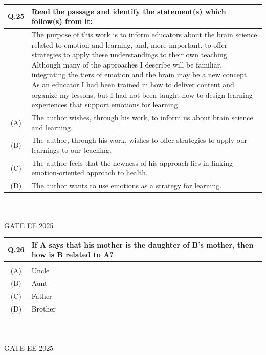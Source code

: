 \documentclass[journal,12pt,onecolumn]{IEEEtran}
\theoremstyle{remark}
\begin{document}
\begin{tabular}{|c|p{16cm}|}\hline
   Q.25 & Read the passage and identify the statement(s) which follow(s) from it: \\   \hline
     & The purpose of this work is to inform educators about the brain science related to emotion and learning, and, more important, to offer strategies to apply these understandings to their own teaching. Although many of the approaches I describe will be familiar, integrating the tiers of emotion and the brain may be a new concept. As an educator I had been trained in how to deliver content and organize my lessons, but I had not been taught how to design learning experiences that support emotions for learning. \\    \hline
  (A) &  The author wishes, through his work, to inform us about brain science and learning. \\     \hline
  (B) & The author, through his work, wishes to offer strategies to apply our learnings to our teaching. \\  \hline
  (C) & The author feels that the newness of his approach lies in linking emotion-oriented approach to health.\\  \hline
  (D) & The author wants to use emotions as a strategy for learning.\\  \hline
\end{tabular} ~\\ \\
GATE EE 2025\\

\begin{tabular}{|c|p{16cm}|}\hline
   Q.26 & If A says that his mother is the daughter of B's mother, then how is B related to A? \\   \hline
     & \\    \hline
  (A) & Uncle\\     \hline
  (B) & Aunt\\  \hline
  (C) & Father\\  \hline
  (D) & Brother\\  \hline
\end{tabular} ~\\ \\
GATE EE 2025 
\end{document}
